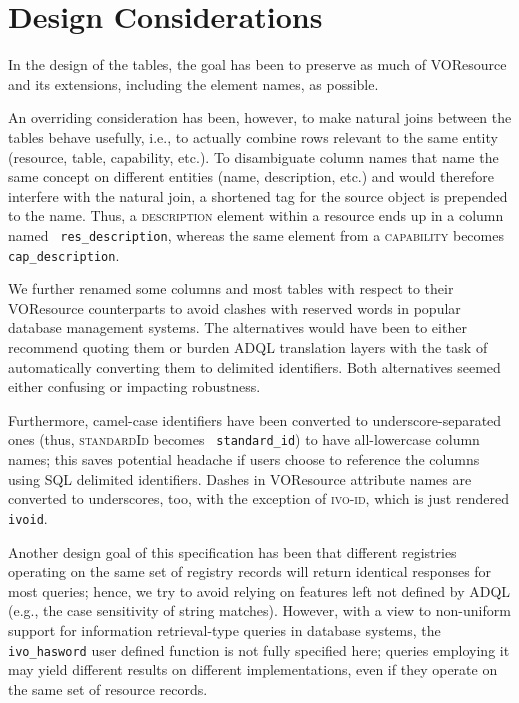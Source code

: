 \documentclass[11pt,a4paper]{ivoa}
\newcommand{\rtent}[1]{\texttt{\color{rtcolor} #1}}
\newcommand{\vorent}[1]{\textsc{#1}}
\begin{document}



\section{Design Considerations}

\label{design}

In the design of the tables, the goal has been to preserve as much of
VOResource and its extensions, including the element names, as
possible.

An overriding consideration has been, however, to make natural joins
between the tables behave usefully, i.e., to actually combine rows
relevant to the same entity (resource, table, capability, etc.).
To disambiguate column names that name the same concept on different
entities (name, description, etc.) and would therefore interfere with
the natural join, a shortened tag for the source object
is prepended to the name.  Thus, a \vorent{description} element within
a resource ends up in a column named
\rtent{res\_description}, whereas the same element from a
\vorent{capability} becomes \rtent{cap\_description}.

We further renamed some columns and most tables 
with respect to their VOResource
counterparts to avoid clashes with reserved words in popular database
management systems.  The alternatives would have been to either recommend
quoting them or burden ADQL translation layers with the task of
automatically converting them to delimited identifiers.  Both
alternatives seemed either confusing or impacting robustness.

Furthermore, camel-case identifiers have been converted to
underscore-separated ones (thus, \vorent{standardId}  becomes
\rtent{standard\_id}) to have all-lowercase column names; this saves
potential headache if users choose to reference the columns using SQL
delimited identifiers.  Dashes in VOResource attribute names are
converted to underscores, too, with the exception of
\vorent{ivo-id}, which is just rendered \rtent{ivoid}.

Another design goal of this specification has been that different registries
operating on the same set of registry records will return identical responses
for most queries; hence, we try to avoid relying on features left not
defined by ADQL (e.g., the case sensitivity of string matches).  However,
with a view to non-uniform support for information retrieval-type
queries in database systems, the \rtent{ivo\_hasword} user defined
function is not fully specified here; queries employing it may yield
different results on different implementations, even if they operate on
the same set of resource records.
\end{document}
